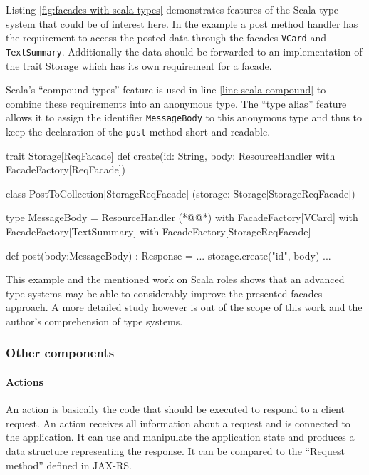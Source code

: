 \documentclass[12pt,a4paper]{scrartcl}		%
\begin{document}
Listing \ref{fig:facades-with-scala-types} demonstrates features of the Scala
type system\cite{Odersky2011} that could be of interest here. In the example a
post method handler has the requirement to access the posted data through the
facades \lstinline:VCard: and \lstinline:TextSummary:. Additionally the data
should be forwarded to an implementation of the trait Storage which has its own
requirement for a facade.

Scala's ``compound types'' feature is used in line \ref{line-scala-compound} to
combine these requirements into an anonymous type. The ``type alias'' feature
allows it to assign the identifier \lstinline:MessageBody: to this anonymous
type and thus to keep the declaration of the \lstinline:post: method short and
readable.

\begin{javalisting}[label=fig:facades-with-scala-types,
                   numbers=left,
                   escapeinside={(*@}{@*)},
                   caption={Implementing the facades approach with Scala's type system}]
trait Storage[ReqFacade] {
 def create(id: String,
            body: ResourceHandler with FacadeFactory[ReqFacade])
}

class PostToCollection[StorageReqFacade]
            (storage: Storage[StorageReqFacade]) {
 type MessageBody = ResourceHandler (*@\label{line-scala-compound}@*)
                      with FacadeFactory[VCard] 
                      with FacadeFactory[TextSummary]
                      with FacadeFactory[StorageReqFacade]
  
 def post(body:MessageBody) : Response = {
  ...
  storage.create("id", body)
  ...
 }
}
\end{javalisting}

This example and the mentioned work on Scala roles shows that an advanced type
systems may be able to considerably improve the presented facades approach. A
more detailed study however is out of the scope of this work and the author's
comprehension of type systems.

\subsubsection{Other components}

\paragraph{Actions}
\label{sec:components-actions}

An action is basically the code that should be executed to respond to a client
request. An action receives all information about a request and is connected to
the application. It can use and manipulate the application state and produces a
data structure representing the response. It can be compared to the ``Request
method'' defined in JAX-RS.
\end{document}

